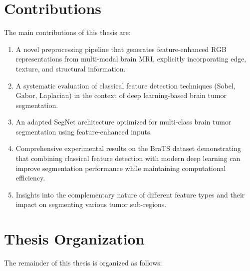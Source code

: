 \section{Contributions}
\label{sec:contributions}

The main contributions of this thesis are:

\begin{enumerate}
    \item A novel preprocessing pipeline that generates feature-enhanced RGB representations from multi-modal brain MRI, explicitly incorporating edge, texture, and structural information.
    
    \item A systematic evaluation of classical feature detection techniques (Sobel, Gabor, Laplacian) in the context of deep learning-based brain tumor segmentation.
    
    \item An adapted SegNet architecture optimized for multi-class brain tumor segmentation using feature-enhanced inputs.
    
    \item Comprehensive experimental results on the BraTS dataset demonstrating that combining classical feature detection with modern deep learning can improve segmentation performance while maintaining computational efficiency.
    
    \item Insights into the complementary nature of different feature types and their impact on segmenting various tumor sub-regions.
\end{enumerate}

\section{Thesis Organization}
\label{sec:organization}

The remainder of this thesis is organized as follows:

